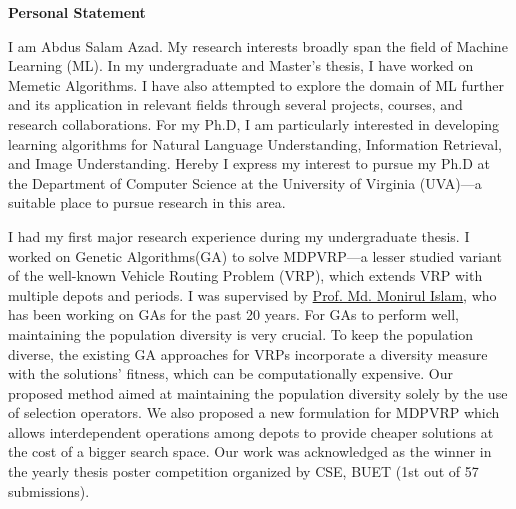 \documentclass[12pt]{article}
\begin{document}


\fancyhf{}
\rfoot{\thepage}

\begin{center}
{\LARGE \bf 
Personal Statement}\\
\end{center}



I am Abdus Salam Azad. My research interests broadly span the field of Machine Learning (ML). In my undergraduate and Master's thesis, I have worked on Memetic Algorithms. I have also attempted to explore the domain of ML further and its application in relevant fields through several projects, courses, and research collaborations. For my Ph.D, I am particularly interested in developing learning algorithms for Natural Language Understanding, Information Retrieval, and Image Understanding. Hereby I express my interest to pursue my Ph.D at the Department of Computer Science at the University of Virginia (UVA)---a suitable place to pursue research in this area. 

I had my first major research experience during my undergraduate thesis. I worked on Genetic Algorithms(GA) to solve MDPVRP---a lesser studied variant of the well-known Vehicle Routing Problem (VRP), which extends VRP with multiple depots and periods. I was supervised by \href{http://cse.buet.ac.bd/faculty/facdetail.php?id=mdmonirulislam}{Prof. Md. Monirul Islam}, who has been working on GAs for the past 20 years. For GAs to perform well, maintaining the population diversity is very crucial. To keep the population diverse, the existing GA approaches for VRPs incorporate a diversity measure with the solutions' fitness, which can be computationally expensive. Our proposed method aimed at maintaining the population diversity solely by the use of selection operators. We also proposed a new formulation for MDPVRP which allows interdependent operations among depots to provide cheaper solutions at the cost of a bigger search space. Our work was acknowledged as the winner in the yearly thesis poster competition organized by CSE, BUET (1st out of 57 submissions).
\end{document}
